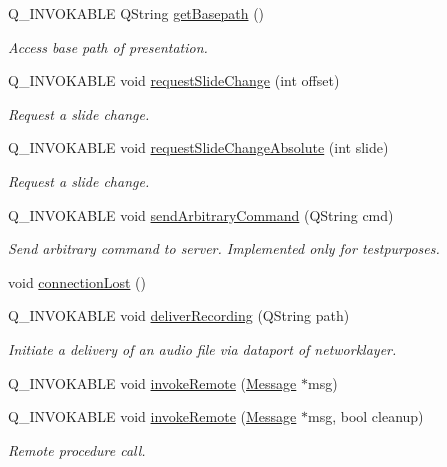 \begin{DoxyCompactItemize}
Q\+\_\+\+I\+N\+V\+O\+K\+A\+B\+L\+E Q\+String \hyperlink{class_client_ab5b465398d44ca0292c353b3b694bcd3}{get\+Basepath} ()
\begin{DoxyCompactList}\small\item\em Access base path of presentation. \end{DoxyCompactList}\item 
Q\+\_\+\+I\+N\+V\+O\+K\+A\+B\+L\+E void \hyperlink{class_client_ab78e2f1e01880452c2477e80051184da}{request\+Slide\+Change} (int offset)
\begin{DoxyCompactList}\small\item\em Request a slide change. \end{DoxyCompactList}\item 
Q\+\_\+\+I\+N\+V\+O\+K\+A\+B\+L\+E void \hyperlink{class_client_aac9cadb66c33c2bfb49c5057a0f14856}{request\+Slide\+Change\+Absolute} (int slide)
\begin{DoxyCompactList}\small\item\em Request a slide change. \end{DoxyCompactList}\item 
Q\+\_\+\+I\+N\+V\+O\+K\+A\+B\+L\+E void \hyperlink{class_client_a6e210504ac8ba9bcab19f52b8ce98e2d}{send\+Arbitrary\+Command} (Q\+String cmd)
\begin{DoxyCompactList}\small\item\em Send arbitrary command to server. Implemented only for testpurposes. \end{DoxyCompactList}\item 
void \hyperlink{class_client_a30faa4edf947fca3331f56149e2c15d0}{connection\+Lost} ()
\item 
Q\+\_\+\+I\+N\+V\+O\+K\+A\+B\+L\+E void \hyperlink{class_client_a358257f5cba7013ff731406d1efc05d2}{deliver\+Recording} (Q\+String path)
\begin{DoxyCompactList}\small\item\em Initiate a delivery of an audio file via dataport of networklayer. \end{DoxyCompactList}\item 
Q\+\_\+\+I\+N\+V\+O\+K\+A\+B\+L\+E void \hyperlink{class_client_a8fb56dacc21effb4ae1eb1c30e87095e}{invoke\+Remote} (\hyperlink{class_message}{Message} $\ast$msg)
\item 
Q\+\_\+\+I\+N\+V\+O\+K\+A\+B\+L\+E void \hyperlink{class_client_a608094e7c3365318eaa978b6af2b68bf}{invoke\+Remote} (\hyperlink{class_message}{Message} $\ast$msg, bool cleanup)
\begin{DoxyCompactList}\small\item\em Remote procedure call. \end{DoxyCompactList}\item 

\end{DoxyCompactItemize}

